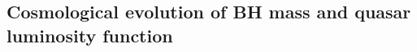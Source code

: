 \documentclass[twocolumn, twocolappendix]{aastex63}
\newcommand{\Msun}{M_\odot}
\newcommand{\Mbh}{M_\bullet}
\newcommand{\fseed}{f_\mathrm{seed}}
\newcommand{\Muv}{M_{1450}}
\newcommand{\red}[1]{\textcolor{red}{ #1}}
\begin{document}
\begin{CJK*}{UTF8}{gbsn}




\section{Cosmological evolution of BH mass and quasar luminosity function}\label{sec:cosm}



\end{CJK*}
\end{document}
